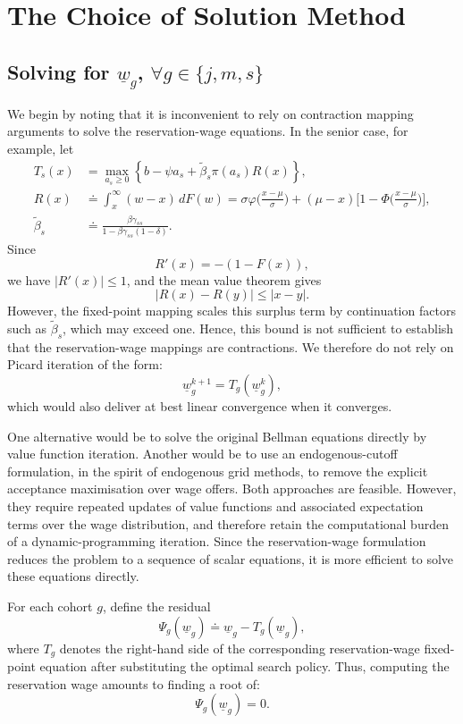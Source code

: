 \documentclass{article}
\newcommand{\lbar}[1]{\underline{#1}} %
\begin{document}
\section{The Choice of Solution Method}
\label{app:solution_method}

\subsection{\texorpdfstring{Solving for $\lbar{w}_g$, $\forall g\in\{j,m,s\}$}{Solving for reservation wages}}

We begin by noting that it is inconvenient to rely on contraction mapping arguments to solve the reservation-wage equations. In the senior case, for example, let
\begin{align*}
T_s(x)
&=
\max_{a_s\geq0}
\left\{
b-\psi a_s+
\tilde\beta_s\pi(a_s)R(x)
\right\},\\
R(x)
&\doteq
\int_x^\infty (w-x)\,dF(w)
=
\sigma\varphi\biggl(\frac{x-\mu}{\sigma}\biggr)
+
(\mu-x)
\Biggl[
1-\Phi\biggl(\frac{x-\mu}{\sigma}\biggr)
\Biggr],\\
\tilde\beta_s
&\doteq
\frac{\beta\gamma_{ss}}
{1-\beta\gamma_{ss}(1-\delta)}.
\end{align*}
Since
\[
R'(x)=-(1-F(x)),
\]
we have $|R'(x)|\leq 1$, and the mean value theorem gives
\[
|R(x)-R(y)|\leq |x-y|.
\]
However, the fixed-point mapping scales this surplus term by continuation factors such as $\tilde\beta_s$, which may exceed one. Hence, this bound is not sufficient to establish that the reservation-wage mappings are contractions. We therefore do not rely on Picard iteration of the form:
\[
\lbar w_g^{k+1}=T_g(\lbar w_g^k),
\]
which would also deliver at best linear convergence when it converges.

One alternative would be to solve the original Bellman equations directly by value function iteration. Another would be to use an endogenous-cutoff formulation, in the spirit of endogenous grid methods, to remove the explicit acceptance maximisation over wage offers. Both approaches are feasible. However, they require repeated updates of value functions and associated expectation terms over the wage distribution, and therefore retain the computational burden of a dynamic-programming iteration. Since the reservation-wage formulation reduces the problem to a sequence of scalar equations, it is more efficient to solve these equations directly.

For each cohort $g$, define the residual
\[
\Psi_g(\lbar{w}_g)
\doteq
\lbar{w}_g-T_g(\lbar{w}_g),
\]
where $T_g$ denotes the right-hand side of the corresponding reservation-wage fixed-point equation after substituting the optimal search policy. Thus, computing the reservation wage amounts to finding a root of:
\[
\Psi_g(\lbar{w}_g)=0.
\]
\end{document}
